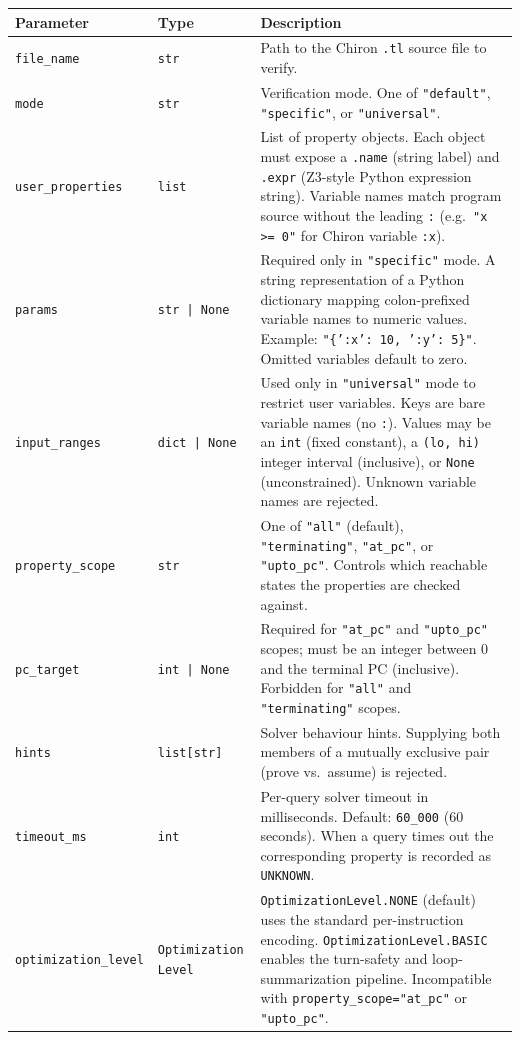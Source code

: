 \begin{longtable}{p{3.2cm} p{2.0cm} p{10.0cm}}
\toprule
\textbf{Parameter} & \textbf{Type} & \textbf{Description} \\
\midrule
\endhead
\texttt{file\_name} & \texttt{str} & Path to the Chiron \texttt{.tl} source file to verify. \\
\addlinespace
\texttt{mode} & \texttt{str} & Verification mode. One of \texttt{"default"}, \texttt{"specific"}, or \texttt{"universal"}. \\
\addlinespace
\texttt{user\_properties} & \texttt{list} & List of property objects. Each object must expose a \texttt{.name} (string label) and \texttt{.expr} (Z3-style Python expression string). Variable names match program source without the leading \texttt{:} (e.g.\ \texttt{"x >= 0"} for Chiron variable \texttt{:x}). \\
\addlinespace
\texttt{params} & \texttt{str | None} & Required only in \texttt{"specific"} mode. A string representation of a Python dictionary mapping colon-prefixed variable names to numeric values. Example: \texttt{"\{':x': 10, ':y': 5\}"}. Omitted variables default to zero. \\
\addlinespace
\texttt{input\_ranges} & \texttt{dict | None} & Used only in \texttt{"universal"} mode to restrict user variables. Keys are bare variable names (no \texttt{:}). Values may be an \texttt{int} (fixed constant), a \texttt{(lo, hi)} integer interval (inclusive), or \texttt{None} (unconstrained). Unknown variable names are rejected. \\
\addlinespace
\texttt{property\_scope} & \texttt{str} & One of \texttt{"all"} (default), \texttt{"terminating"}, \texttt{"at\_pc"}, or \texttt{"upto\_pc"}. Controls which reachable states the properties are checked against. \\
\addlinespace
\texttt{pc\_target} & \texttt{int | None} & Required for \texttt{"at\_pc"} and \texttt{"upto\_pc"} scopes; must be an integer between 0 and the terminal PC (inclusive). Forbidden for \texttt{"all"} and \texttt{"terminating"} scopes. \\
\addlinespace
\texttt{hints} & \texttt{list[str]} & Solver behaviour hints. Supplying both members of a mutually exclusive pair (prove vs.\ assume) is rejected. \\
\addlinespace
\texttt{timeout\_ms} & \texttt{int} & Per-query solver timeout in milliseconds. Default: \texttt{60\_000} (60 seconds). When a query times out the corresponding property is recorded as \texttt{UNKNOWN}. \\
\addlinespace
\texttt{optimization\_level} & \texttt{Optimization Level} & \texttt{OptimizationLevel.NONE} (default) uses the standard per-instruction encoding. \texttt{OptimizationLevel.BASIC} enables the turn-safety and loop-summarization pipeline. Incompatible with \texttt{property\_scope="at\_pc"} or \texttt{"upto\_pc"}. \\
\bottomrule
\end{longtable}

